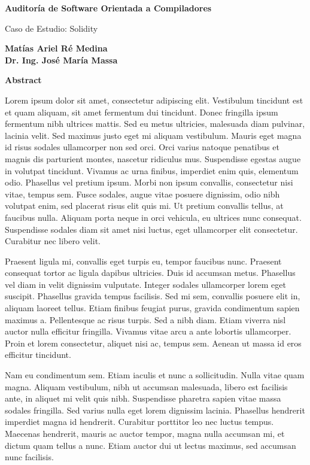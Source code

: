 \thispagestyle{plain}
\begin{center}
    \Large
    \textbf{Auditoría de Software Orientada a Compiladores}

    \vspace{0.2cm}
    \large
    {Caso de Estudio: Solidity}
 
    \vspace{0.4cm}
    \textbf{{Matías Ariel Ré Medina}\\
    {Dr. Ing. José María Massa}
    }
 
    \vspace{0.9cm}
    \textbf{Abstract}
\end{center}

Lorem ipsum dolor sit amet, consectetur adipiscing elit. Vestibulum tincidunt est et quam aliquam, sit amet fermentum dui tincidunt. Donec fringilla ipsum fermentum nibh ultrices mattis. Sed eu metus ultricies, malesuada diam pulvinar, lacinia velit. Sed maximus justo eget mi aliquam vestibulum. Mauris eget magna id risus sodales ullamcorper non sed orci. Orci varius natoque penatibus et magnis dis parturient montes, nascetur ridiculus mus. Suspendisse egestas augue in volutpat tincidunt. Vivamus ac urna finibus, imperdiet enim quis, elementum odio. Phasellus vel pretium ipsum. Morbi non ipsum convallis, consectetur nisi vitae, tempus sem. Fusce sodales, augue vitae posuere dignissim, odio nibh volutpat enim, sed placerat risus elit quis mi. Ut pretium convallis tellus, at faucibus nulla. Aliquam porta neque in orci vehicula, eu ultrices nunc consequat. Suspendisse sodales diam sit amet nisi luctus, eget ullamcorper elit consectetur. Curabitur nec libero velit.

Praesent ligula mi, convallis eget turpis eu, tempor faucibus nunc. Praesent consequat tortor ac ligula dapibus ultricies. Duis id accumsan metus. Phasellus vel diam in velit dignissim vulputate. Integer sodales ullamcorper lorem eget suscipit. Phasellus gravida tempus facilisis. Sed mi sem, convallis posuere elit in, aliquam laoreet tellus. Etiam finibus feugiat purus, gravida condimentum sapien maximus a. Pellentesque ac risus turpis. Sed a nibh diam. Etiam viverra nisl auctor nulla efficitur fringilla. Vivamus vitae arcu a ante lobortis ullamcorper. Proin et lorem consectetur, aliquet nisi ac, tempus sem. Aenean ut massa id eros efficitur tincidunt.

Nam eu condimentum sem. Etiam iaculis et nunc a sollicitudin. Nulla vitae quam magna. Aliquam vestibulum, nibh ut accumsan malesuada, libero est facilisis ante, in aliquet mi velit quis nibh. Suspendisse pharetra sapien vitae massa sodales fringilla. Sed varius nulla eget lorem dignissim lacinia. Phasellus hendrerit imperdiet magna id hendrerit. Curabitur porttitor leo nec luctus tempus. Maecenas hendrerit, mauris ac auctor tempor, magna nulla accumsan mi, et dictum quam tellus a nunc. Etiam auctor dui ut lectus maximus, sed accumsan nunc facilisis.